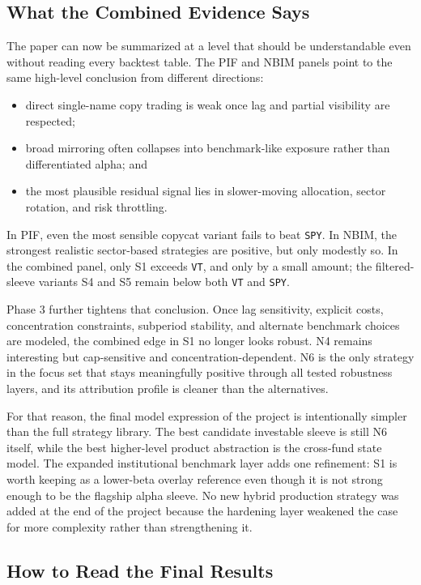 \documentclass[conference]{IEEEtran}
\begin{document}
\subsection{What the Combined Evidence Says}

The paper can now be summarized at a level that should be understandable even without reading every backtest table. The PIF and NBIM panels point to the same high-level conclusion from different directions:
\begin{itemize}[leftmargin=1.4em]
    \item direct single-name copy trading is weak once lag and partial visibility are respected;
    \item broad mirroring often collapses into benchmark-like exposure rather than differentiated alpha; and
    \item the most plausible residual signal lies in slower-moving allocation, sector rotation, and risk throttling.
\end{itemize}

In PIF, even the most sensible copycat variant fails to beat \texttt{SPY}. In NBIM, the strongest realistic sector-based strategies are positive, but only modestly so. In the combined panel, only S1 exceeds \texttt{VT}, and only by a small amount; the filtered-sleeve variants S4 and S5 remain below both \texttt{VT} and \texttt{SPY}.

Phase 3 further tightens that conclusion. Once lag sensitivity, explicit costs, concentration constraints, subperiod stability, and alternate benchmark choices are modeled, the combined edge in S1 no longer looks robust. N4 remains interesting but cap-sensitive and concentration-dependent. N6 is the only strategy in the focus set that stays meaningfully positive through all tested robustness layers, and its attribution profile is cleaner than the alternatives.

For that reason, the final model expression of the project is intentionally simpler than the full strategy library. The best candidate investable sleeve is still N6 itself, while the best higher-level product abstraction is the cross-fund state model. The expanded institutional benchmark layer adds one refinement: S1 is worth keeping as a lower-beta overlay reference even though it is not strong enough to be the flagship alpha sleeve. No new hybrid production strategy was added at the end of the project because the hardening layer weakened the case for more complexity rather than strengthening it.

\subsection{How to Read the Final Results}
\end{document}
